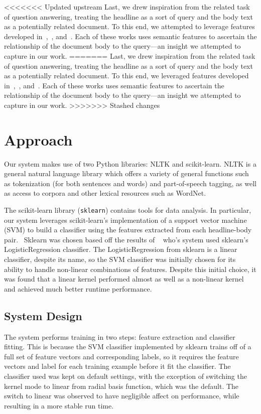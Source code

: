 \documentclass[11pt,a4paper]{article}
\begin{document}
<<<<<<< Updated upstream
Last, we drew inspiration from the related task of question answering, treating the headline as a sort of query and the body text as a potentially related document. To this end, we attempted to leverage features developed in~\cite{Hasan2013},~\cite{Shen2007}, and~\cite{Surdeanu2011}. Each of these works uses semantic features to ascertain the relationship of the document body to the query---an insight we attempted to capture in our work.
=======
Last, we drew inspiration from the related task of question answering, treating the headline as a sort of query and the body text as a potentially related document. To this end, we leveraged features developed in~\cite{Meyer2003},~\cite{Shen2007}, and~\cite{Surdeanu2011}. Each of these works uses semantic features to ascertain the relationship of the document body to the query---an insight we attempted to capture in our work.
>>>>>>> Stashed changes

\section{Approach}
Our system makes use of two Python libraries: NLTK and scikit-learn. NLTK is a general natural language library which offers a variety of general functions such as tokenization (for both sentences and words) and part-of-speech tagging, as well as access to corpora and other lexical resources such as WordNet.~\cite{Bird2004}

The scikit-learn library (\texttt{sklearn}) contains tools for data analysis. In particular, our system leverages scikit-learn's implementation of a support vector machine (SVM) to build a classifier using the features extracted from each headline-body pair.~\cite{scikit-learn} Sklearn was chosen based off the results of ~\cite{ferreira2016emergent} who's system used sklearn's LogisticRegression classifier. The LogisticRegression from sklearn is a linear classifier, despite its name, so the SVM classifier was initially chosen for its ability to handle non-linear combinations of features. Despite this initial choice, it was found that a linear kernel performed almost as well as a non-linear kernel and achieved much better runtime performance.
\subsection{System Design}
The system performs training in two steps: feature extraction and classifier fitting. This is because the SVM classifier implemented by sklearn trains off of a full set of feature vectors and corresponding labels, so it requires the feature vectors and label for each training example before it fit the classifier. The classifier used was kept on default settings, with the exception of switching the kernel mode to linear from radial basis function, which was the default. The switch to linear was observed to have negligible affect on performance, while resulting in a more stable run time.
\end{document}
